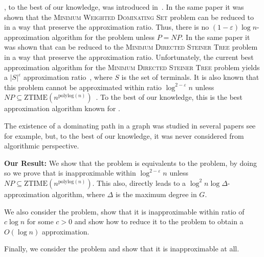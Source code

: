 \Prob{}, to the best of our knowledge, was introduced in~\cite{shin2010approximation}.
In the same paper it was shown that the \textsc{Minimum Weighted Dominating Set} problem 
can be reduced to \Prob{} in a way that preserve the approximation ratio.
Thus, there is no $(1 - \varepsilon)\log n$-approximation algorithm for the \Prob{} problem
unless $P = NP$.
In the same paper it was shown that \Prob{} can be reduced to the 
\textsc{Minimum Directed Steiner Tree} problem in a way that preserve the approximation ratio.
Unfortunately, the current best approximation algorithm for the 
\textsc{Minimum Directed Steiner Tree} problem yields a $|S|^\varepsilon$ 
approximation ratio~\cite{charikar1999approximation},
where $S$ is the set of terminals.
It is also known that this problem cannot be approximated within ratio 
$\log^{2 - \varepsilon} n$ 
unless $NP \subseteq \text{ZTIME}(n^{\text{polylog}(n)})$~\cite{halperin2003polylogarithmic}.
To the best of our knowledge, this is the best approximation algorithm known for \Prob{}.
     
The existence of a dominating path in a graph was studied in several 
papers see~\cite{broersma1988existence, faudree2017minimum} for example,
but, to the best of our knowledge, it was never considered from algorithmic perspective.

\textbf{Our Result:}
We show that the \Problem{} problem is equivalents to the \ProblemGroup{} problem, 
by doing so we prove that \Prob{} is inapproximable within $\log^{2 - \varepsilon} n$   
unless $NP \subseteq \text{ZTIME}(n^{\text{polylog}(n)})$.
This also, directly leads to a $\log^2 n \log \Delta$-approximation algorithm, 
where $\Delta$ is the maximum degree in $G$.

We also consider the \ProblemStar{} problem, show that it is inapproximable within
ratio of $c \log n$ for some $c > 0$ and show how to reduce it to the \ProblemSetCover{}
problem to obtain a $O(\log n)$ approximation.

Finally, we consider the \ProblemPath{} problem and show that it is inapproximable at all.